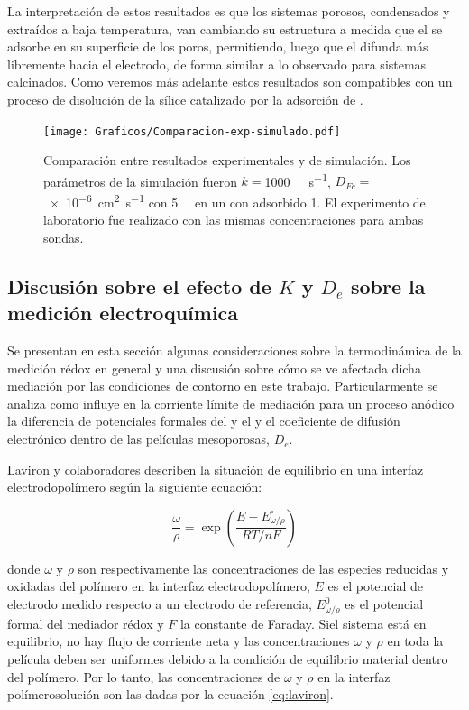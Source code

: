 		La interpretación de estos resultados es que los sistemas porosos, condensados y extraídos a baja temperatura, van cambiando su estructura a medida que el \ru\space se adsorbe en su superficie de los poros, permitiendo, luego que el \fc\space difunda más libremente hacia el electrodo, de forma similar a lo observado para sistemas calcinados. Como veremos más adelante estos resultados son compatibles con un proceso de disolución de la sílice catalizado por la adsorción de \aminorutenio.

				\begin{figure}[h!]
					\centering
			 	    \texttt{[image: Graficos/Comparacion-exp-simulado.pdf]}
			        \caption[Simulación EQ comparadas con datos experimentales]{Comparación entre resultados experimentales y de simulación. Los parámetros de la simulación fueron $k=$\SI{1000}{\per\Molar\per\second}, $D_{Fc}\!=$ \SI{e-6}{\square\cm\per\second} con \fc\space \SI{5}{\milli\Molar} en un \pdm\space con \ru\space adsorbido \SI{1}{\Molar}. El experimento de laboratorio fue realizado con las mismas concentraciones para ambas sondas.}
			        \label{fig:comp_sim_exp}
			      	\end{figure}

	\subsection{Discusión sobre el efecto de \texorpdfstring{$K$}{K} y \texorpdfstring{$D_e$}{De} sobre la medición electroquímica}

		Se presentan en esta sección algunas consideraciones sobre la termodinámica de la medición rédox en general y una discusión sobre cómo se ve afectada dicha mediación por las condiciones de contorno en este trabajo. Particularmente se analiza como influye en la corriente límite de mediación para un proceso anódico la diferencia de potenciales formales del \ru\space y el \fc\space y el coeficiente de difusión electrónico dentro de las películas mesoporosas, $D_e$.

		Laviron y colaboradores\cite{laviron1983} describen la situación de equilibrio en una interfaz electrodo\textbar polímero según la siguiente ecuación:

			\begin{equation}
				\frac{\omega}{\rho} = \exp{\left(\frac{E-E_{\omega / \rho}^{\circ}}{RT/nF}\right)}
				\label{eq:laviron}
			\end{equation}

		\noindent donde $\omega$ y $\rho$ son respectivamente las concentraciones de las especies reducidas y oxidadas del polímero en la interfaz electrodo\textbar polímero, $E$ es el potencial de electrodo medido respecto a un electrodo de referencia, $E_{\omega / \rho}^{0}$ es el potencial formal del mediador rédox y $F$ la constante de Faraday. Si\space el sistema está en equilibrio, no hay flujo de corriente neta y las concentraciones $\omega$ y $\rho$ en toda la película deben ser uniformes debido a la condición de equilibrio material dentro del polímero. Por lo tanto, las concentraciones de $\omega$ y $\rho$ en la interfaz polímero\textbar solución son las dadas por la ecuación \ref{eq:laviron}.

